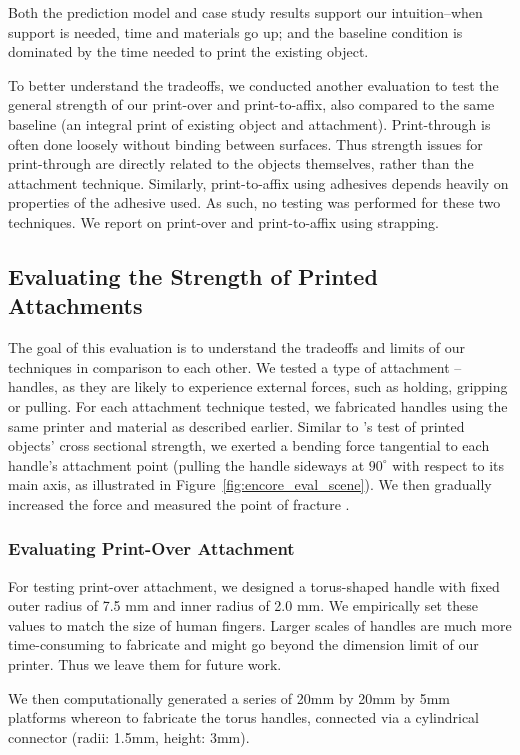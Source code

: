 Both the prediction model and case study results support our intuition--when support is needed, time and materials go up; and the baseline condition is dominated by the time needed to print the existing object.

To better understand the tradeoffs, we conducted another evaluation to test the general strength of our print-over and print-to-affix, also compared to the same baseline (an integral print of existing object and attachment). Print-through is often done loosely without binding between surfaces. Thus strength issues for print-through are directly related to the objects themselves, rather than the attachment technique. Similarly, print-to-affix using adhesives depends heavily on properties of the adhesive used. As such, no testing was performed for these two techniques. We report on print-over and print-to-affix using strapping.

\subsection{Evaluating the Strength of Printed Attachments}
The goal of this evaluation is to understand the tradeoffs and limits of our techniques in comparison to each other. We tested a type of attachment – handles, as they are likely to experience external forces, such as holding, gripping or pulling. For each attachment technique tested, we fabricated handles using the same printer and material as described earlier. Similar to \cite{umetani2013cross}'s test of printed objects' cross sectional strength, we exerted a bending force tangential to each handle's attachment point (pulling the handle sideways at $90^{\circ}$ with respect to its main axis, as illustrated in Figure~\ref{fig:encore_eval_scene}). We then gradually increased the force and measured the point of fracture \cite{tetelman1967fracture}.

\subsubsection{Evaluating Print-Over Attachment}
For testing print-over attachment, we designed a torus-shaped handle with fixed outer radius of 7.5 mm and inner radius of 2.0 mm. We empirically set these values to match the size of human fingers. Larger scales of handles are much more time-consuming to fabricate and might go beyond the dimension limit of our printer. Thus we leave them for future work.

We then computationally generated a series of 20mm by 20mm by 5mm platforms whereon to fabricate the torus handles, connected via a cylindrical connector (radii: 1.5mm, height: 3mm).

